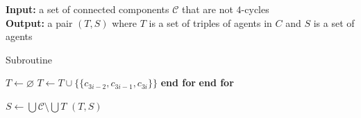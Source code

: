 \begin{algorithm}
\textbf{Input:} a set of connected components $\mathcal{C}$ that are not $4$-cycles\\
\textbf{Output:} a pair $(T, S)$ where $T$ is a set of triples of agents in $C$ and $S$ is a set of agents
\smallskip
\begin{algorithmic}
\caption{Subroutine~ \label{alg:3defr_wje_subroutine_nonC4s}}
\State $T \gets \varnothing$
        \State $T \gets T \cup \{ \{ c_{3i-2}, c_{3i-1}, c_{3i} \} \}$
    \EndFor
    \State \textbf{end for}
\EndFor
\State \textbf{end for}
\smallskip

\State $S \gets \bigcup \mathcal{C} \setminus \bigcup T$
\State \Return $(T, S)$
\end{algorithmic}
\end{algorithm}
